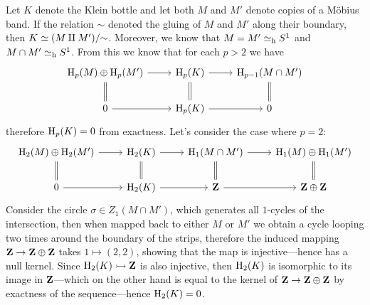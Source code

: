 \begin{example}
    \label{exp:klein-bottle-homology}
    Let \(K\) denote the Klein bottle and let both \(M\) and \(M'\) denote copies of
    a M\"{o}bius band. If the relation \(\sim\) denoted the gluing of \(M\) and
    \(M'\) along their boundary, then \(K \simeq (M \amalg M')/{\sim}\). Moreover, we know
    that \(M = M' \simeq_{\text{h}} S^1\) and \(M \cap M' \simeq_{\text{h}} S^1\). From this we know that for
    each \(p > 2\) we have
    \[
        \begin{tikzcd}
            \Hmlg_p(M) \oplus \Hmlg_p(M') \ar[r] \ar[d, equals]
            &\Hmlg_p(K) \ar[r] \ar[d, equals]
            &\Hmlg_{p-1}(M \cap M') \ar[d, equals]
            \\
            0 \ar[r]
            &\Hmlg_p(K) \ar[r]
            &0
        \end{tikzcd}
    \]
    therefore \(\operatorname{H}_p(K) = 0\) from exactness. Let's consider the case where
    \(p = 2\):
    \[
        \begin{tikzcd}
            \Hmlg_2(M) \oplus \Hmlg_2(M') \ar[r] \ar[d, equals]
            &\Hmlg_2(K)
            \ar[r] \ar[d, equals]
            &\Hmlg_1(M \cap M')
            \ar[r] \ar[d, equals]
            &\Hmlg_1(M) \oplus \Hmlg_1(M') \ar[d, equals]
            \\
            0 \ar[r]
            &\Hmlg_2(K)
            \ar[r]
            &\Z
            \ar[r]
            &\Z \oplus \Z
        \end{tikzcd}
    \]
    Consider the circle \(\sigma \in Z_1(M \cap M')\), which generates all
    \(1\)-cycles of the intersection, then when mapped back to either \(M\) or
    \(M'\) we obtain a cycle looping two times around the boundary of the strips,
    therefore the induced mapping \(\mathbf{Z} \to \mathbf{Z} \oplus \mathbf{Z}\) takes
    \(1 \mapsto (2, 2)\), showing that the map is injective---hence has a null kernel. Since
    \(\operatorname{H}_2(K) \rightarrowtail \mathbf{Z}\) is also injective, then \(\operatorname{H}_2(K)\) is isomorphic to
    its image in \(\mathbf{Z}\)---which on the other hand is equal to the kernel of
    \(\mathbf{Z} \to \mathbf{Z} \oplus \mathbf{Z}\) by exactness of the sequence---hence \(\operatorname{H}_2(K) = 0\).


\end{example}
